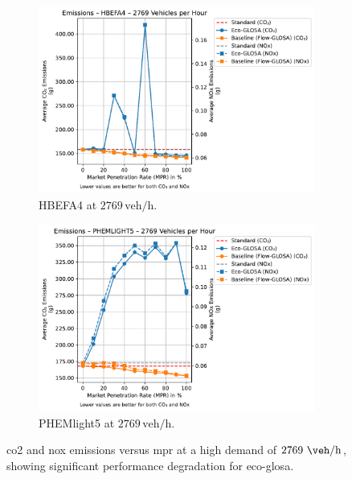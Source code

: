 \begin{figure}[htbp]
  \centering
  \begin{subfigure}[b]{0.98\textwidth}
    \includegraphics[width=\textwidth]{data/img/Emissions/Emissions_HBEFA4_Cars2769.pdf}
    \caption{HBEFA4 at $2769\,\mathrm{veh/h}$.}
    \label{fig:Emis_2769_HBEFA4}
  \end{subfigure}
  \begin{subfigure}[b]{0.98\textwidth}
    \includegraphics[width=\textwidth]{data/img/Emissions/Emissions_PHEMLIGHT5_Cars2769.pdf}
    \caption{PHEMlight5 at $2769\,\mathrm{veh/h}$.}
    \label{fig:Emis_2769_PHEM}
  \end{subfigure}
  \caption[\ac{co2} and \ac{nox} emissions vs. \ac{mpr} at $2769~\unit{\veh\per\hour}$]{\ac{co2} and \ac{nox} emissions versus \ac{mpr} at a high demand of $2769~\unit{\veh\per\hour}$, showing significant performance degradation for \ac{eco-glosa}.}
  \label{fig:Emis_2769}
\end{figure}

